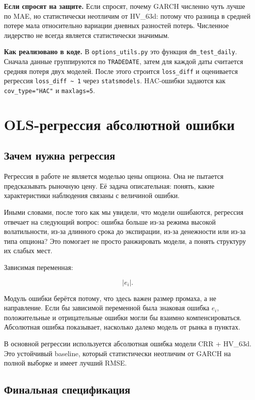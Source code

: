 \documentclass[11pt,a4paper]{article}
\newcommand{\answer}[1]{%
  \vspace{0.15em}
  \noindent\colorbox{softgreen}{%
    \parbox{\dimexpr\linewidth-2\fboxsep\relax}{\textbf{Если спросят на защите.} #1}%
  }\vspace{0.2em}
}
\newcommand{\impl}[1]{%
  \vspace{0.15em}
  \noindent\colorbox{softblue}{%
    \parbox{\dimexpr\linewidth-2\fboxsep\relax}{\textbf{Как реализовано в коде.} #1}%
  }\vspace{0.2em}
}
\begin{document}
\answer{Если спросят, почему GARCH численно чуть лучше по MAE, но статистически неотличим от HV\_63d: потому что разница в средней потере мала относительно вариации дневных разностей потерь. Численное лидерство не всегда является статистически значимым.}

\impl{В \texttt{options\_utils.py} это функция \texttt{dm\_test\_daily}. Сначала данные группируются по \texttt{TRADEDATE}, затем для каждой даты считается средняя потеря двух моделей. После этого строится \texttt{loss\_diff} и оценивается регрессия \texttt{loss\_diff \textasciitilde{} 1} через \texttt{statsmodels}. HAC-ошибки задаются как \texttt{cov\_type="HAC"} и \texttt{maxlags=5}.}

\section{OLS-регрессия абсолютной ошибки}

\subsection{Зачем нужна регрессия}

Регрессия в работе не является моделью цены опциона. Она не пытается предсказывать рыночную цену. Её задача описательная: понять, какие характеристики наблюдения связаны с величиной ошибки.

Иными словами, после того как мы увидели, что модели ошибаются, регрессия отвечает на следующий вопрос: ошибка больше из-за режима высокой волатильности, из-за длинного срока до экспирации, из-за денежности или из-за типа опциона? Это помогает не просто ранжировать модели, а понять структуру их слабых мест.

Зависимая переменная:

\begin{equation}
|e_i|.
\end{equation}

Модуль ошибки берётся потому, что здесь важен размер промаха, а не направление. Если бы зависимой переменной была знаковая ошибка $e_i$, положительные и отрицательные ошибки могли бы взаимно компенсироваться. Абсолютная ошибка показывает, насколько далеко модель от рынка в пунктах.

В основной регрессии используется абсолютная ошибка модели CRR + HV\_63d. Это устойчивый baseline, который статистически неотличим от GARCH на полной выборке и имеет лучший RMSE.

\subsection{Финальная спецификация}
\end{document}
